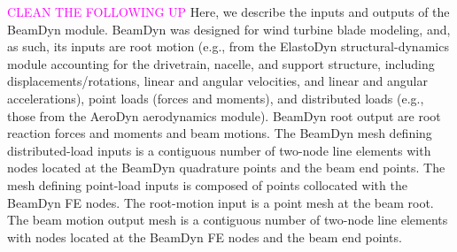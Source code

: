 \documentclass{aiaa-tc}
\newcommand{\mas}[1]{\textcolor{magenta}{#1}}
\begin{document}
\mas{CLEAN THE FOLLOWING UP}
Here, we describe the inputs and outputs of the BeamDyn module.
BeamDyn was designed for wind turbine blade modeling, and,  as such, its inputs are root motion (e.g., from the ElastoDyn structural-dynamics module accounting for the drivetrain, nacelle, and support structure, including displacements/rotations, linear and angular velocities, and linear and angular accelerations), point loads (forces and moments), and distributed loads (e.g., those from the AeroDyn aerodynamics module). 
BeamDyn root output are root reaction forces and moments and beam motions. 
The BeamDyn mesh defining distributed-load inputs is a contiguous number of two-node line elements with nodes located at the BeamDyn quadrature points and the beam end points.  
The mesh defining point-load inputs is composed of points collocated with the BeamDyn FE nodes.  
The root-motion input is a point mesh at the beam root. 
The beam motion output mesh is a contiguous number of two-node line elements with nodes located at the BeamDyn FE nodes and the beam end points. 
\end{document}
